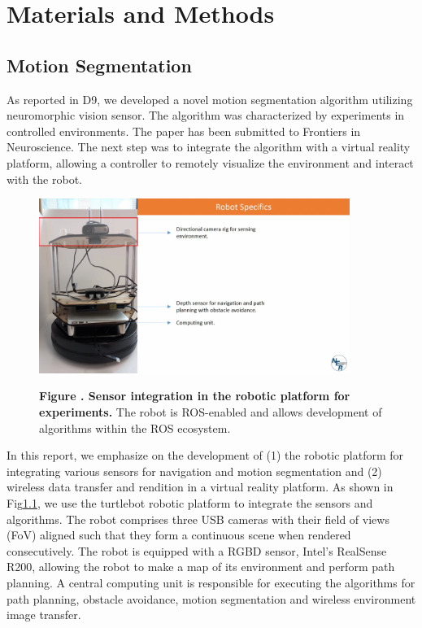 \chapter{Materials and Methods}

\section{Motion Segmentation }
As reported in D9, we developed a novel motion segmentation algorithm utilizing neuromorphic vision sensor. The algorithm was characterized by experiments in controlled environments. The paper has been submitted to Frontiers in Neuroscience. The next step was to integrate the algorithm with a virtual reality platform, allowing a controller to remotely visualize the environment and interact with the robot.
\begin{figure}[h!]
  \begin{center}
    \includegraphics[width=0.90\textwidth]{figures/motion-seg/setup}%
  \end{center}
  \textbf{\label{fig:turtle_setup} Figure . Sensor integration in the robotic platform for experiments.} { The robot is ROS-enabled and allows development of algorithms within the ROS ecosystem. }
\end{figure}

In this report, we emphasize on the development of (1) the robotic platform for integrating various sensors for navigation and motion segmentation and (2) wireless data transfer and rendition in a virtual reality platform. As shown in Fig\ref{fig:turtle_setup}, we use the turtlebot robotic platform to integrate the sensors and algorithms. The robot comprises three USB cameras with their field of views (FoV) aligned such that they form a continuous scene when rendered consecutively. The robot is equipped with a RGBD sensor, Intel's RealSense R200, allowing the robot to make a map of its environment and perform path planning. A central computing unit is responsible for executing the algorithms for path planning, obstacle avoidance, motion segmentation and wireless environment image transfer.


